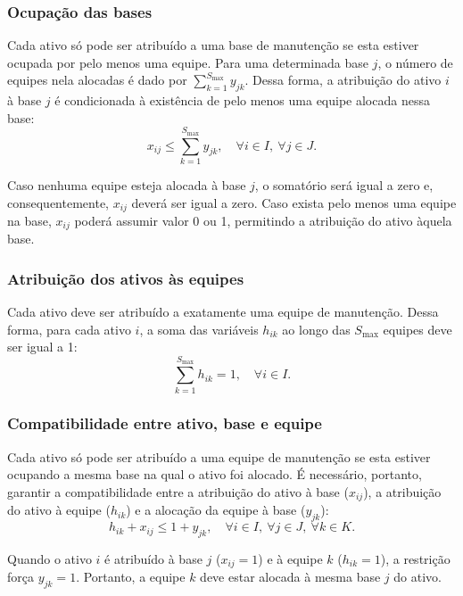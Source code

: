 \documentclass[conference]{IEEEtran}
\begin{document}
\subsubsection{Ocupação das bases}
Cada ativo só pode ser atribuído a uma base de manutenção se esta estiver ocupada por pelo menos uma equipe. Para uma determinada base $j$, o número de equipes nela alocadas é dado por $\sum_{k=1}^{S_{\max}} y_{jk}$. Dessa forma, a atribuição do ativo $i$ à base $j$ é condicionada à existência de pelo menos uma equipe alocada nessa base:
\begin{equation}
x_{ij} \le \sum_{k=1}^{S_{\max}} y_{jk}, \quad \forall i \in I,\ \forall j \in J.
\label{eq:r3}
\end{equation}

Caso nenhuma equipe esteja alocada à base $j$, o somatório será igual a zero e, consequentemente, $x_{ij}$ deverá ser igual a zero. Caso exista pelo menos uma equipe na base, $x_{ij}$ poderá assumir valor 0 ou 1, permitindo a atribuição do ativo àquela base.

\subsubsection{Atribuição dos ativos às equipes}
Cada ativo deve ser atribuído a exatamente uma equipe de manutenção. Dessa forma, para cada ativo $i$, a soma das variáveis $h_{ik}$ ao longo das $S_{\max}$ equipes deve ser igual a 1:
\begin{equation}
\sum_{k=1}^{S_{\max}} h_{ik} = 1, \quad \forall i \in I.
\label{eq:r4}
\end{equation}

\subsubsection{Compatibilidade entre ativo, base e equipe}
Cada ativo só pode ser atribuído a uma equipe de manutenção se esta estiver ocupando a mesma base na qual o ativo foi alocado. É necessário, portanto, garantir a compatibilidade entre a atribuição do ativo à base ($x_{ij}$), a atribuição do ativo à equipe ($h_{ik}$) e a alocação da equipe à base ($y_{jk}$):
\begin{equation}
h_{ik} + x_{ij} \le 1 + y_{jk}, \quad \forall i \in I,\ \forall j \in J,\ \forall k \in K.
\label{eq:r5}
\end{equation}

Quando o ativo $i$ é atribuído à base $j$ ($x_{ij} = 1$) e à equipe $k$ ($h_{ik} = 1$), a restrição força $y_{jk} = 1$. Portanto, a equipe $k$ deve estar alocada à mesma base $j$ do ativo.
\end{document}
